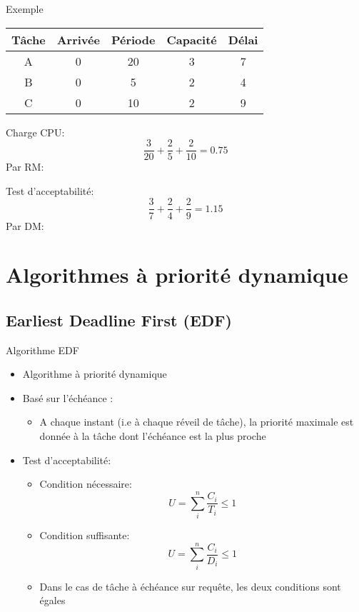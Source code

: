 \begin{frame}{Exemple}
  \begin{center}
    \begin{tabular}{ccccc}
      \hline
      Tâche & Arrivée & Période & Capacité & Délai \\
      \hline
      A & 0 & 20 & 3 & 7\\
      B & 0 &  5 & 2 & 4\\
      C & 0 & 10 & 2 & 9\\
      \hline
    \end{tabular}
  \end{center}
  \begin{overprint}
    Charge CPU:
    $$\frac{3}{20} + \frac{2}{5} + \frac{2}{10} = 0.75$$
    Par RM:
    \begin{center}
      
    \end{center}
    Test d'acceptabilité:
    $$\frac{3}{7} + \frac{2}{4} + \frac{2}{9} = 1.15$$
    Par DM:
    \begin{center}
      
    \end{center}
  \end{overprint}
\end{frame} 

\section{Algorithmes à priorité dynamique}

\subsection{Earliest Deadline First (EDF)}

\begin{frame}{Algorithme EDF}
  \begin{itemize}
  \item Algorithme à priorité dynamique
  \item Basé sur l'échéance :
    \begin{itemize}
    \item A chaque instant (i.e à chaque réveil de tâche), la priorité
      maximale  est donnée  à la  tâche  dont l'échéance  est la  plus
      proche
    \end{itemize}
  \item Test d'acceptabilité:
    \begin{itemize}
    \item Condition nécessaire:
      $$U = \sum_i^n \frac{C_i}{T_i} ≤ 1$$
    \item Condition suffisante:
      $$U = \sum_i^n \frac{C_i}{D_i} ≤ 1$$
    \item  Dans le  cas  de tâche  à  échéance sur  requête, les  deux
      conditions sont égales
    \end{itemize}
  \end{itemize}
\end{frame}

